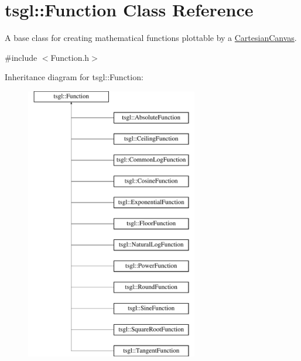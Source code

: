 \hypertarget{classtsgl_1_1_function}{\section{tsgl\-:\-:\-Function \-Class \-Reference}
\label{classtsgl_1_1_function}
}


\-A base class for creating mathematical functions plottable by a \hyperlink{classtsgl_1_1_cartesian_canvas}{\-Cartesian\-Canvas}.  




{\ttfamily \#include $<$\-Function.\-h$>$}

\-Inheritance diagram for tsgl\-:\-:\-Function\-:\begin{figure}[H]
\begin{center}
\leavevmode
\includegraphics[height=12.000000cm]{classtsgl_1_1_function}
\end{center}
\end{figure}
